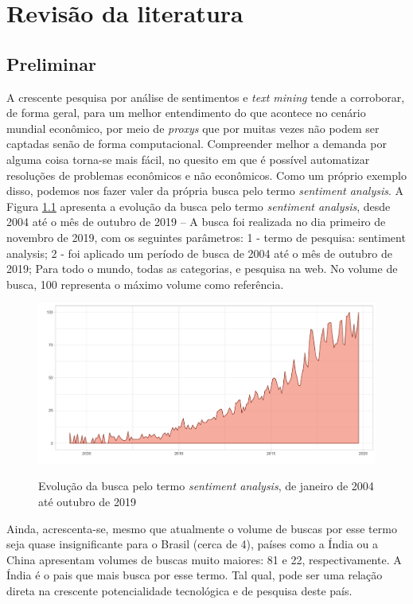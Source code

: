 \chapter{Revisão da literatura}

\section{Preliminar}

A crescente pesquisa por análise de sentimentos e \textit{text mining} tende a corroborar, de forma geral, para um melhor entendimento do que acontece no cenário mundial econômico, por meio de \textit{proxys} que por muitas vezes não podem ser captadas senão de forma computacional. Compreender melhor a demanda por alguma coisa torna-se mais fácil, no quesito em que é possível automatizar resoluções de problemas econômicos e não econômicos. Como um próprio exemplo disso, podemos nos fazer valer da própria busca pelo termo \textit{sentiment analysis}. A Figura \ref{fig:google} apresenta a evolução da busca pelo termo \textit{sentiment analysis}, desde 2004 até o mês de outubro de 2019 -- A busca foi realizada no dia primeiro de novembro de 2019, com os seguintes parâmetros: 1 - termo de pesquisa: sentiment analysis; 2 - foi aplicado um período de busca de 2004 até o mês de outubro de 2019; Para todo o mundo, todas as categorias, e pesquisa na web. No volume de busca, 100 representa o máximo volume como referência. 

\begin{figure}[!h]
    \centering
    \caption{Evolução da busca pelo termo \textit{sentiment analysis}, de janeiro de 2004 até outubro de 2019}
    \includegraphics[width=\textwidth]{capitulos/figures/google.pdf}
    \label{fig:google}
\end{figure}

Ainda, acrescenta-se, mesmo que atualmente o volume de buscas por esse termo seja quase insignificante para o Brasil (cerca de 4), países como a Índia ou a China apresentam volumes de buscas muito maiores: 81 e 22, respectivamente. A Índia é o pais que mais busca por esse termo. Tal qual, pode ser uma relação direta na crescente potencialidade tecnológica e de pesquisa deste país. 

